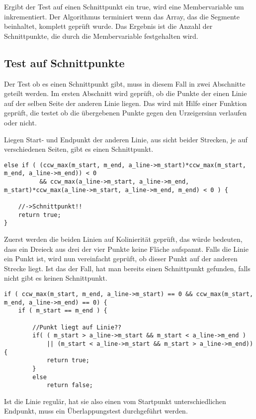 Ergibt der Test auf einen Schnittpunkt ein true, wird eine Membervariable um inkrementiert. Der Algorithmus terminiert wenn das Array, das die Segmente beinhaltet, komplett geprüft wurde. Das Ergebnis ist die Anzahl der Schnittpunkte, die durch die Membervariable festgehalten wird.

\subsection{Test auf Schnittpunkte}
Der Test ob es einen Schnittpunkt gibt, muss in diesem Fall in zwei Abschnitte geteilt werden. Im ersten Abschnitt wird geprüft, ob die Punkte der einen Linie auf der selben Seite der anderen Linie liegen. Das wird mit Hilfe einer Funktion geprüft, die testet ob die übergebenen Punkte gegen den Urzeigersinn verlaufen oder nicht.

Liegen Start- und Endpunkt der anderen Linie, aus sicht beider Strecken, je auf verschiedenen Seiten, gibt es einen Schnittpunkt.

\begin{lstlisting}
else if ( (ccw_max(m_start, m_end, a_line->m_start)*ccw_max(m_start, m_end, a_line->m_end)) < 0
		  && ccw_max(a_line->m_start, a_line->m_end, m_start)*ccw_max(a_line->m_start, a_line->m_end, m_end) < 0 ) {

	//->Schnittpunkt!!
	return true;
}
\end{lstlisting}
 
Zuerst werden die beiden Linien auf Kolinierität geprüft, das würde bedeuten, dass ein Dreieck aus drei der vier Punkte keine Fläche aufspannt.
Falls die Linie ein Punkt ist, wird nun vereinfacht geprüft, ob dieser Punkt auf der anderen Strecke liegt. Ist das der Fall, hat man bereits einen Schnittpunkt gefunden, falls nicht gibt es keinen Schnittpunkt.
\begin{lstlisting}
if ( ccw_max(m_start, m_end, a_line->m_start) == 0 && ccw_max(m_start, m_end, a_line->m_end) == 0) {
	if ( m_start == m_end ) {

		//Punkt liegt auf Linie??
		if( ( m_start > a_line->m_start && m_start < a_line->m_end )
			|| (m_start < a_line->m_start && m_start > a_line->m_end)){
			return true;
		}
		else
			return false;
\end{lstlisting}

Ist die Linie regulär, hat sie also einen vom Startpunkt unterschiedlichen Endpunkt, muss ein \"Uberlappungstest durchgeführt werden.

